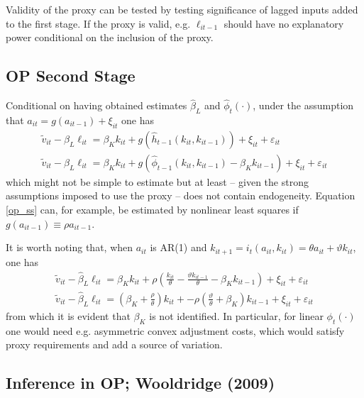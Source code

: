 \documentclass[11pt]{article}
\begin{document}
Validity of the proxy can be tested by testing significance of lagged inputs added to the first stage.
If the proxy is valid, e.g. $\ell_{it-1}$ should have no explanatory power conditional on the inclusion of the proxy.

\subsection*{OP Second Stage}

Conditional on having obtained estimates $\hat{\beta}_L$ and $\hat{\phi}_t(\cdot)$, under the assumption that $a_{it} = g(a_{it-1}) + \xi_{it}$ one has
\begin{equation}
	\begin{gathered}
		\label{op_ss}
			\tilde{v}_{it} - \hat{\beta}_L \ell_{it} = \beta_K k_{it} + g(\hat{h}_{t-1}(k_{it}, k_{it-1})) + \xi_{it} + \varepsilon_{it}  \\
			\tilde{v}_{it} - \hat{\beta}_L \ell_{it} = \beta_K k_{it} + g(\hat{\phi}_{t-1}(k_{it}, k_{it-1}) - \beta_K k_{it-1}) + \xi_{it} + \varepsilon_{it}
	\end{gathered}
\end{equation}
which might not be simple to estimate but at least -- given the strong assumptions imposed to use the proxy -- does not contain endogeneity.
Equation \eqref{op_ss} can, for example, be estimated by nonlinear least squares if $g(a_{it-1}) \equiv \rho a_{it-1}$.

It is worth noting that, when $a_{it}$ is AR(1) and $k_{it+1} = i_t(a_{it}, k_{it}) = \theta a_{it} + \vartheta k_{it}$, one has
\begin{equation*}
	\begin{gathered}
		\tilde{v}_{it} - \hat{\beta}_L \ell_{it} = \beta_K k_{it} + \rho(\frac{k_{it}}{\theta} - \frac{\vartheta k_{it-1}}{\theta} - \beta_K k_{it-1}) + \xi_{it} + \varepsilon_{it} \\
		\tilde{v}_{it} - \hat{\beta}_L \ell_{it} = (\beta_K + \frac{\rho}{\theta})k_{it} +  - \rho(\frac{\vartheta}{\theta} + \beta_K) k_{it-1} + \xi_{it} + \varepsilon_{it}
	\end{gathered}
\end{equation*}
from which it is evident that $\beta_K$ is not identified.
In particular, for linear $\phi_t(\cdot)$ one would need e.g. asymmetric convex adjustment costs, which would satisfy proxy requirements and add a source of variation.

\subsection*{Inference in OP; Wooldridge (2009)}
\end{document}

